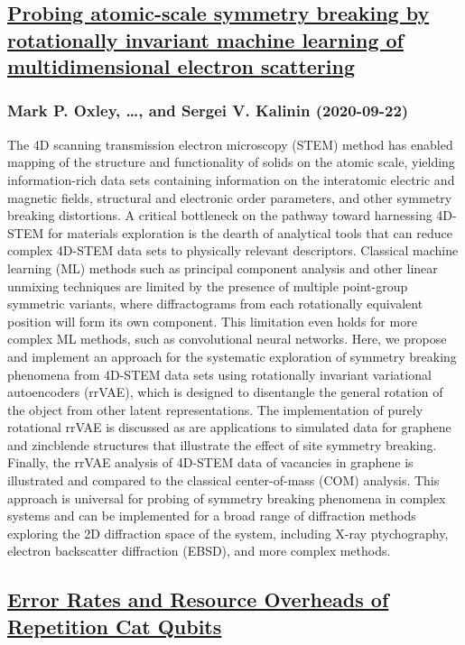 {\subsection*{\href{http://arxiv.org/abs/2009.10758v1}{Probing atomic-scale symmetry breaking by rotationally invariant machine  learning of multidimensional electron scattering}}
\subsubsection*{Mark P. Oxley, \dots, and Sergei V. Kalinin (2020-09-22)}
The 4D scanning transmission electron microscopy (STEM) method has enabled
mapping of the structure and functionality of solids on the atomic scale,
yielding information-rich data sets containing information on the interatomic
electric and magnetic fields, structural and electronic order parameters, and
other symmetry breaking distortions. A critical bottleneck on the pathway
toward harnessing 4D-STEM for materials exploration is the dearth of analytical
tools that can reduce complex 4D-STEM data sets to physically relevant
descriptors. Classical machine learning (ML) methods such as principal
component analysis and other linear unmixing techniques are limited by the
presence of multiple point-group symmetric variants, where diffractograms from
each rotationally equivalent position will form its own component. This
limitation even holds for more complex ML methods, such as convolutional neural
networks. Here, we propose and implement an approach for the systematic
exploration of symmetry breaking phenomena from 4D-STEM data sets using
rotationally invariant variational autoencoders (rrVAE), which is designed to
disentangle the general rotation of the object from other latent
representations. The implementation of purely rotational rrVAE is discussed as
are applications to simulated data for graphene and zincblende structures that
illustrate the effect of site symmetry breaking. Finally, the rrVAE analysis of
4D-STEM data of vacancies in graphene is illustrated and compared to the
classical center-of-mass (COM) analysis. This approach is universal for probing
of symmetry breaking phenomena in complex systems and can be implemented for a
broad range of diffraction methods exploring the 2D diffraction space of the
system, including X-ray ptychography, electron backscatter diffraction (EBSD),
and more complex methods.

\subsection*{\href{http://arxiv.org/abs/2009.10756v1}{Error Rates and Resource Overheads of Repetition Cat Qubits}}
}

